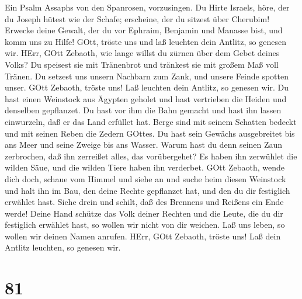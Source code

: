  Ein Psalm Assaphs von den Spanrosen, vorzusingen.
 Du Hirte Israels, höre, der du Joseph hütest wie der
Schafe; erscheine, der du sitzest über Cherubim!  Erwecke
deine Gewalt, der du vor Ephraim, Benjamin und Manasse bist, und komm
uns zu Hilfe!  GOtt, tröste uns und laß leuchten dein
Antlitz, so genesen wir.  HErr, GOtt Zebaoth, wie lange
willst du zürnen über dem Gebet deines Volks?  Du speisest
sie mit Tränenbrot und tränkest sie mit großem Maß voll Tränen.
 Du setzest uns unsern Nachbarn zum Zank, und unsere Feinde
spotten unser.  GOtt Zebaoth, tröste uns! Laß leuchten dein
Antlitz, so genesen wir.  Du hast einen Weinstock aus
Ägypten geholet und hast vertrieben die Heiden und denselben gepflanzet.
 Du hast vor ihm die Bahn gemacht und hast ihn lassen
einwurzeln, daß er das Land erfüllet hat.  Berge sind mit
seinem Schatten bedeckt und mit seinen Reben die Zedern GOttes.
 Du hast sein Gewächs ausgebreitet bis ans Meer und seine
Zweige bis ans Wasser.  Warum hast du denn seinen Zaun
zerbrochen, daß ihn zerreißet alles, das vorübergehet?  Es
haben ihn zerwühlet die wilden Säue, und die wilden Tiere haben ihn
verderbet.  GOtt Zebaoth, wende dich doch, schaue vom
Himmel und siehe an und suche heim diesen Weinstock  und
halt ihn im Bau, den deine Rechte gepflanzet hat, und den du dir
festiglich erwählet hast.  Siehe drein und schilt, daß des
Brennens und Reißens ein Ende werde!  Deine Hand schütze
das Volk deiner Rechten und die Leute, die du dir festiglich erwählet
hast,  so wollen wir nicht von dir weichen. Laß uns leben,
so wollen wir deinen Namen anrufen.  HErr, GOtt Zebaoth,
tröste uns! Laß dein Antlitz leuchten, so genesen wir.

\hypertarget{section-80}{%
\section{81}\label{section-80}}


